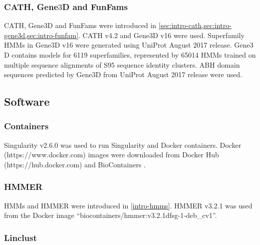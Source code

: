 \subsubsection{CATH, Gene$3$D and FunFams}

CATH, Gene$3$D and FunFams were introduced in \ref{sec:intro-cath,sec:intro-gene3d,sec:intro-funfam}. CATH \cite{Sillitoe2019} v4.2 and Gene$3$D \cite{Lewis2018} v16 were used. Superfamily HMMs in Gene$3$D v16 were generated using UniProt \cite{Bateman2019} August 2017 release. Gene$3$D contains models for \num{6119} superfamilies, represented by \num{65014} HMMs trained on multiple sequence alignments of S95 sequence identity clusters. ABH domain sequences predicted by Gene$3$D from UniProt August 2017 release were used.

\subsection{Software}

\subsubsection{Containers}

Singularity \cite{Kurtzer2017} v2.6.0 was used to run Singularity and Docker containers. Docker (https://www.docker.com) images were downloaded from Docker Hub (https://hub.docker.com) and BioContainers \cite{DaVeigaLeprevost2017}.

\subsubsection{HMMER}

HMMs and HMMER were introduced in \ref{intro-hmms}. HMMER \cite{Mistry2013} v3.2.1 was used from the Docker image ``biocontainers/hmmer:v3.2.1dfsg-1-deb\_cv1''.

\subsubsection{Linclust}

